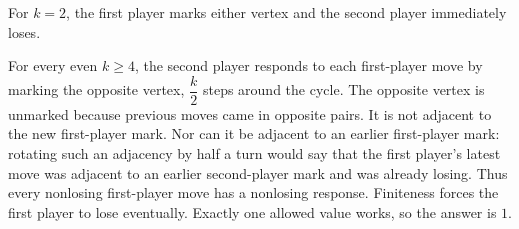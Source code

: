 For $k=2$, the first player marks either vertex and the second player immediately loses.

For every even $k\ge4$, the second player responds to each first-player move by marking the opposite vertex, $\dfrac{k}{2}$ steps around the cycle. The opposite vertex is unmarked because previous moves came in opposite pairs. It is not adjacent to the new first-player mark. Nor can it be adjacent to an earlier first-player mark: rotating such an adjacency by half a turn would say that the first player's latest move was adjacent to an earlier second-player mark and was already losing. Thus every nonlosing first-player move has a nonlosing response. Finiteness forces the first player to lose eventually. Exactly one allowed value works, so the answer is $\boxed1$.
